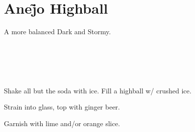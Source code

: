 \section[Ane\~{j}o Highball]{
    Ane\~{j}o Highball
}

\begin{recipestats}[
        servings=1,
        preptime=5~\minute,
        original=\citeauthor{anejoHighballDeGroff}~\cite{anejoHighballDeGroff},
    ]
\end{recipestats}

\begin{recipeabstract}
    A more balanced Dark and Stormy.
\end{recipeabstract}

\begin{ingredientcolumns}
    \begin{ingredientblock}
        \\
        \\
    \end{ingredientblock}

    \begin{ingredientblock}
        \\
    \end{ingredientblock}
\end{ingredientcolumns}

\begin{preparation}
\item Shake all but the soda with ice.
    Fill a highball w/ crushed ice.
\item Strain into glass, top with ginger beer.
\item Garnish with lime and/or orange slice.
\end{preparation}

\recipeend%
